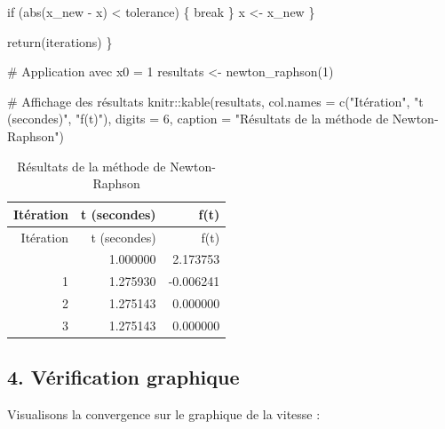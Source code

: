 \documentclass[
  12pt,
  letterpaper,
]{book}
\newenvironment{Shaded}{}{}
\newcommand{\AttributeTok}[1]{\textcolor[rgb]{0.84,0.23,0.29}{#1}}
\newcommand{\CommentTok}[1]{\textcolor[rgb]{0.42,0.45,0.49}{#1}}
\newcommand{\ControlFlowTok}[1]{\textcolor[rgb]{0.84,0.23,0.29}{#1}}
\newcommand{\DecValTok}[1]{\textcolor[rgb]{0.00,0.36,0.77}{#1}}
\newcommand{\FunctionTok}[1]{\textcolor[rgb]{0.44,0.26,0.76}{#1}}
\newcommand{\NormalTok}[1]{\textcolor[rgb]{0.14,0.16,0.18}{#1}}
\newcommand{\OtherTok}[1]{\textcolor[rgb]{0.44,0.26,0.76}{#1}}
\newcommand{\SpecialCharTok}[1]{\textcolor[rgb]{0.00,0.36,0.77}{#1}}
\newcommand{\StringTok}[1]{\textcolor[rgb]{0.01,0.18,0.38}{#1}}
\theoremstyle{remark}
\begin{document}
\begin{Shaded}
\begin{Highlighting}[]
    \ControlFlowTok{if}\NormalTok{ (}\FunctionTok{abs}\NormalTok{(x\_new }\SpecialCharTok{{-}}\NormalTok{ x) }\SpecialCharTok{\textless{}}\NormalTok{ tolerance) \{}
      \ControlFlowTok{break}
\NormalTok{    \}}
\NormalTok{    x }\OtherTok{\textless{}{-}}\NormalTok{ x\_new}
\NormalTok{  \}}
  
  \FunctionTok{return}\NormalTok{(iterations)}
\NormalTok{\}}

\CommentTok{\# Application avec x0 = 1}
\NormalTok{resultats }\OtherTok{\textless{}{-}} \FunctionTok{newton\_raphson}\NormalTok{(}\DecValTok{1}\NormalTok{)}

\CommentTok{\# Affichage des résultats}
\NormalTok{knitr}\SpecialCharTok{::}\FunctionTok{kable}\NormalTok{(resultats,}
             \AttributeTok{col.names =} \FunctionTok{c}\NormalTok{(}\StringTok{"Itération"}\NormalTok{, }\StringTok{"t (secondes)"}\NormalTok{, }\StringTok{"f(t)"}\NormalTok{),}
             \AttributeTok{digits =} \DecValTok{6}\NormalTok{,}
             \AttributeTok{caption =} \StringTok{"Résultats de la méthode de Newton{-}Raphson"}\NormalTok{)}
\end{Highlighting}
\end{Shaded}

\begin{longtable}[]{@{}rrr@{}}
\caption{Résultats de la méthode de Newton-Raphson}\tabularnewline
\toprule\noalign{}
Itération & t (secondes) & f(t) \\
\midrule\noalign{}
\endfirsthead
\toprule\noalign{}
Itération & t (secondes) & f(t) \\
\midrule\noalign{}
\endhead
\bottomrule\noalign{}
\endlastfoot
0 & 1.000000 & 2.173753 \\
1 & 1.275930 & -0.006241 \\
2 & 1.275143 & 0.000000 \\
3 & 1.275143 & 0.000000 \\
\end{longtable}

\subsection{4. Vérification graphique}\label{vuxe9rification-graphique}

Visualisons la convergence sur le graphique de la vitesse :
\end{document}
